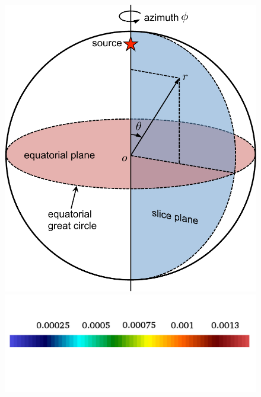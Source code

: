 \documentclass[extra]{gji}
\begin{document}
\begin{figure}
  \centering
  \begin{minipage}{0.4\textwidth}
    \centering
    \includegraphics[width=.9\textwidth]{fig/snapshot/sketch.pdf} 
    \label{fig:sk}
    \includegraphics[width=.9\textwidth]{fig/snapshot/colorbar.pdf} 
  \end{minipage}%
  \begin{minipage}{0.6\textwidth}
    \begin{minipage}{.585\textwidth}
      \centering

\end{minipage}
\end{minipage}
\end{figure}
\end{document}
